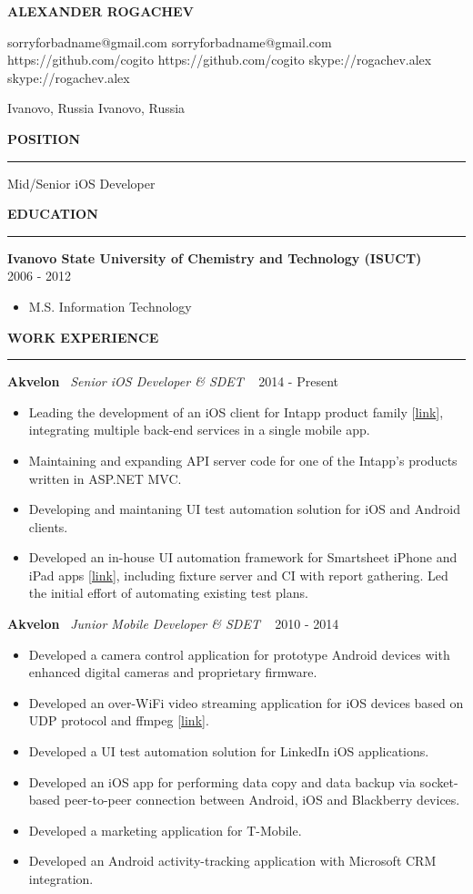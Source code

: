 ﻿\documentclass{article}
\newcommand*{\applicant}[1]{\gdef\applicanttext{#1}}
\newcommand*{\github}[1]{\gdef\githubtext{#1}}
\newcommand*{\email}[1]{\gdef\emailtext{#1}}
\newcommand*{\skype}[1]{\gdef\skypetext{#1}}
\newcommand*{\location}[1]{\gdef\locationtext{#1}}
\renewcommand\maketitle{
  {\setstretch{1.2}
    \centerline{
       \textbf{\huge{\expandafter\MakeUppercase\expandafter{\applicanttext}}}
    }
    \begin{center}
      \ifdefined\emailtext
        \faEnvelopeO \hspace{0.1cm} \emailtext \hspace{0.1cm}
      \fi
      \ifdefined\githubtext
        \faGithub \hspace{0.1cm} \githubtext \hspace{0.1cm}
      \fi
      \ifdefined\skypetext
        \faSkype \hspace{0.1cm} \skypetext \hspace{0.1cm}

      \fi
      \ifdefined\linkedintext
        \faLinkedin \hspace{0.1cm} \linkedintext

      \fi
    \end{center}

    \begin{center}
      \ifdefined\locationtext
        \faHome \hspace{0.1cm} \locationtext
      \fi
    \end{center}
  }
}
\newcommand{\cvsection}[1]{
  \vspace{2.6ex}
  \noindent\textbf{\large{\uppercase{#1}}}
  \vspace{1ex}
  \hrule
  \vspace{1.5ex}
}
\newcommand{\cvparagraph}[3]{
  \noindent\indent
  \textbf{#1}
  \ 
  \textit{#2}
  \ 
  \hfill{}
  {#3}\vspace{1ex}}
\newcommand{\cvlist}[1]{
  \begin{itemize}[topsep=0ex,leftmargin=*,itemsep=0ex,parsep=1ex,labelwidth=\parindent]
    #1
  \end{itemize}
}
\begin{document}
\pagestyle{fancy}
\fancyhf{}
\renewcommand{\headrulewidth}{0pt}
\cfoot{ \the\year\ --\ \LaTeX }

\applicant{Alexander Rogachev}
\github{https://github.com/cogito}
\email{sorryforbadname@gmail.com}
\skype{skype://rogachev.alex}
\location{Ivanovo, Russia}

\maketitle

\cvsection{Position}
Mid/Senior iOS Developer

\cvsection{Education}
\cvparagraph{Ivanovo State University of Chemistry and Technology (ISUCT)}{}{2006 - 2012}
\begin{itemize}[topsep=0ex,leftmargin=*]
  \item M.S. Information Technology
\end{itemize}

\cvsection{Work Experience}

\cvparagraph{Akvelon}{Senior iOS Developer \& SDET}{2014 - Present}
\cvlist{
  \item Leading the development of an iOS client for Intapp product family [\href{https://itunes.apple.com/us/app/intapp/id1052877767}{link}], integrating multiple back-end services in a single mobile app.
  \item Maintaining and expanding API server code for one of the Intapp's products written in ASP.NET MVC.
  \item Developing and maintaning UI test automation solution for iOS and Android clients.
  \item Developed an in-house UI automation framework for Smartsheet iPhone and iPad apps [\href{https://itunes.apple.com/us/app/smartsheet/id568421135}{link}], including fixture server and CI with report gathering. Led the initial effort of automating existing test plans.
}
\vspace{1ex}

\cvparagraph{Akvelon}{Junior Mobile Developer \& SDET}{2010 - 2014}
\cvlist{
  \item Developed a camera control application for prototype Android devices with enhanced digital cameras and proprietary firmware.
  \item Developed an over-WiFi video streaming application for iOS devices based on UDP protocol and ffmpeg [\href{http://neuronbeta.com/chirpglobal/chirpvision/app/}{link}].
  \item Developed a UI test automation solution for LinkedIn iOS applications.
  \item Developed an iOS app for performing data copy and data backup via socket-based peer-to-peer connection between Android, iOS and Blackberry devices.
  \item Developed a marketing application for T-Mobile.
  \item Developed an Android activity-tracking application with Microsoft CRM integration.
}
\end{document}
